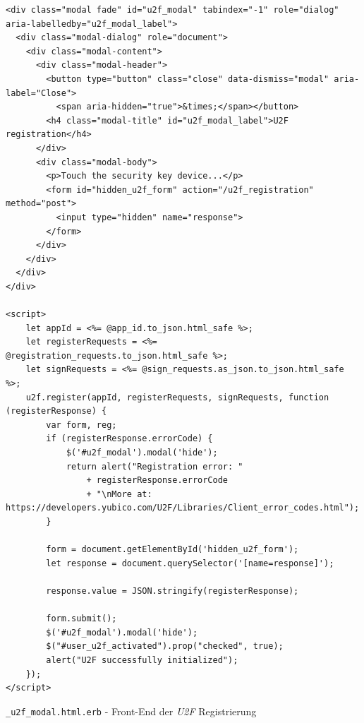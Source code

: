 \documentclass[11pt,a4paper,ngerman]{scrreprt}
\begin{document}
\begin{listing}[htpb]
    \begin{verbatim}
<div class="modal fade" id="u2f_modal" tabindex="-1" role="dialog" aria-labelledby="u2f_modal_label">
  <div class="modal-dialog" role="document">
    <div class="modal-content">
      <div class="modal-header">
        <button type="button" class="close" data-dismiss="modal" aria-label="Close">
          <span aria-hidden="true">&times;</span></button>
        <h4 class="modal-title" id="u2f_modal_label">U2F registration</h4>
      </div>
      <div class="modal-body">
        <p>Touch the security key device...</p>
        <form id="hidden_u2f_form" action="/u2f_registration" method="post">
          <input type="hidden" name="response">
        </form>
      </div>
    </div>
  </div>
</div>

<script>
    let appId = <%= @app_id.to_json.html_safe %>;
    let registerRequests = <%= @registration_requests.to_json.html_safe %>;
    let signRequests = <%= @sign_requests.as_json.to_json.html_safe %>;
    u2f.register(appId, registerRequests, signRequests, function (registerResponse) {
        var form, reg;
        if (registerResponse.errorCode) {
            $('#u2f_modal').modal('hide');
            return alert("Registration error: "
                + registerResponse.errorCode
                + "\nMore at: https://developers.yubico.com/U2F/Libraries/Client_error_codes.html");
        }

        form = document.getElementById('hidden_u2f_form');
        let response = document.querySelector('[name=response]');

        response.value = JSON.stringify(registerResponse);

        form.submit();
        $('#u2f_modal').modal('hide');
        $("#user_u2f_activated").prop("checked", true);
        alert("U2F successfully initialized");
    });
</script>
    \end{verbatim}
    \caption{\texttt{\_u2f\_modal.html.erb} - Front-End der \textit{U2F} Registrierung}
    \label{lst:u2f_modal.html.erb}
\end{listing}
\end{document}
